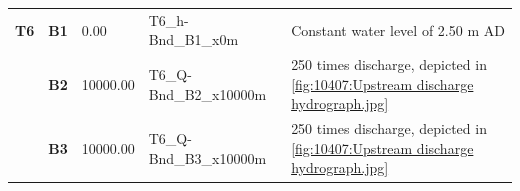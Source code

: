 \begin{longtable}{|p{13.5mm}|p{10.5mm}|p{16.0mm}|p{29.5mm}|p{47.5mm}|}
\hline
\scriptsize\textcolor[rgb]{1,0,0}{\textbf{T6}} & \scriptsize\textbf{B1} & \scriptsize{0.00}     & \scriptsize{T6\_h-Bnd\_B1\_x0m}     & \scriptsize{Constant water level of 2.50 m AD}                                                \\
                                               & \scriptsize\textbf{B2} & \scriptsize{10000.00} & \scriptsize{T6\_Q-Bnd\_B2\_x10000m} & \scriptsize{250 times discharge, depicted in \autoref{fig:10407:Upstream discharge hydrograph.jpg}} \\
                                               & \scriptsize\textbf{B3} & \scriptsize{10000.00} & \scriptsize{T6\_Q-Bnd\_B3\_x10000m} & \scriptsize{250 times discharge, depicted in \autoref{fig:10407:Upstream discharge hydrograph.jpg}} \\
[1ex] \hline
\end{longtable}


